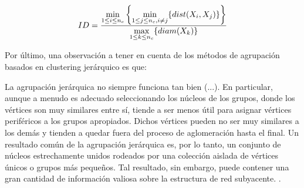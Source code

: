 \documentclass[letterpaper, 11pt]{book}
\theoremstyle{definition}
\theoremstyle{remark}
\begin{document}
\begin{equation}\label{indice_Dunn}
    ID = 
     \frac{ \operatornamewithlimits{min}\limits_{1 \leq i \leq n_c} \left\{ \operatornamewithlimits{min}\limits_{1 \leq j \leq n_c, i \neq j}   \{ dist(X_i,X_j) \}  \right\}  }{ \operatornamewithlimits{max}\limits_{1 \leq k \leq n_c}  \{diam(X_k)\} }
\end{equation} 



Por último, una observación a tener en cuenta de los métodos de agrupación basados en clustering jerárquico es que: 
\begin{center}
    \begin{minipage}{0.9\linewidth}
        {\setlength{\parindent}{12pt}\small
         La agrupación jerárquica no siempre funciona tan bien (...). 
         En particular, aunque a menudo es adecuado seleccionando los núcleos de los grupos, donde los vértices son muy similares entre sí, tiende a ser menos útil para asignar vértices periféricos a los grupos apropiados. 
         Dichos vértices pueden no ser muy similares a los demás y tienden a quedar fuera del proceso de aglomeración hasta el final. 
         Un resultado común de la agrupación jerárquica es, por lo tanto, un conjunto de núcleos estrechamente unidos rodeados por una colección aislada de vértices únicos o grupos más pequeños. 
         Tal resultado, sin embargo, puede contener una gran cantidad de información valiosa sobre la estructura de red subyacente. 
         \normalsize \citep[384]{2010_Newman_Networks}.
        }
    \end{minipage}
\end{center}
\end{document}
